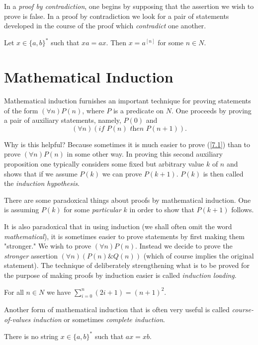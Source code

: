 \documentclass[a4paper,10pt,twoside]{book}
\begin{document}
In a \textit{proof by contradiction}, one begins by supposing that the assertion we wish to prove is false. In a proof by contradiction we look for a pair of statements developed in the course of the proof which \textit{contradict} one another.

\thm{} {
    Let $x\in\{a,b\}^*$ such that $xa=ax$. Then $x=a^{[n]}$ for some $n\in N$.
}

\section{Mathematical Induction}

Mathematical induction furnishes an important technique for proving statements of the form $(\forall n)P(n)$, where $P$ is a predicate on $N$. One proceeds by proving a pair of auxiliary statements, namely, $P(0)$ and
\begin{equation}
    (\forall n)(\textit{if }P(n)\textit{ then }P(n+1)).
    \label{7.1}
\end{equation}

Why is this helpful? Because sometimes it is much easier to prove (\ref{7.1}) than to prove $(\forall n)P(n)$ in some other way. In proving this second auxiliary proposition one typically considers some fixed but arbitrary value $k$ of $n$ and shows that if we assume $P(k)$ we can prove $P(k+1)$. $P(k)$ is then called the \textit{induction hypothesis}.

There are some paradoxical things about proofs by mathematical induc­tion. One is assuming $P(k)$ for some \textit{particular} $k$ in order to show that $P(k+1)$ follows.

It is also paradoxical that in using induction (we shall often omit the word \textit{mathematical}), it is sometimes easier to prove statements by first making them "stronger." We wish to prove $(\forall n)P(n)$. Instead we decide to prove the \textit{stronger} assertion $(\forall n)(P(n)\&Q(n))$ (which of course implies the original statement). The technique of deliber­ately strengthening what is to be proved for the purpose of making proofs by induction easier is called \textit{induction loading}.

\thm{} {
    For all $n\in N$ we have $\sum_{i = 0}^n(2i + 1)=(n + 1)^2$.
}

Another form of mathematical induction that is often very useful is called \textit{course-of-values induction} or sometimes \textit{complete induction}.

\thm{} {
    There is no string $x\in\{a,b\}^*$ such that $ax=xb$.
}
\end{document}
